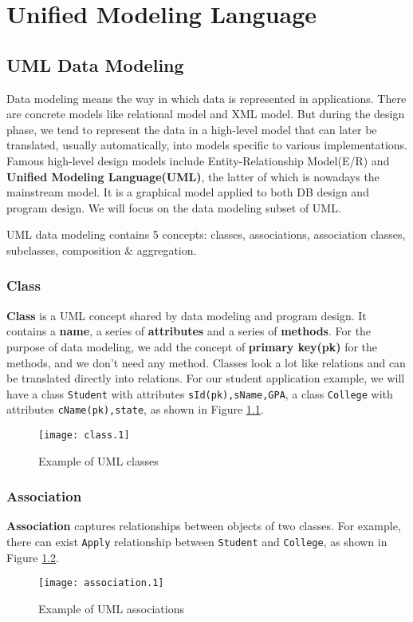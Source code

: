 \ifx\PREAMBLE\undefined


\fi
\chapter{Unified Modeling Language}
\section{UML Data Modeling}
Data modeling means the way in which data is represented in applications. There are concrete models like relational model and XML model. But during the design phase, we tend to represent the data in a high-level model that can later be translated, usually automatically, into models specific to various implementations. Famous high-level design models include Entity-Relationship Model(E/R) and \textbf{Unified Modeling Language(UML)}, the latter of which is nowadays the mainstream model. It is a graphical model applied to both DB design and program design. We will focus on the data modeling subset of UML.

UML data modeling contains 5 concepts: classes, associations, association classes, subclasses, composition \& aggregation. 
\subsection{Class}
\textbf{Class} is a UML concept shared by data modeling and program design. It contains a \textbf{name}, a series of \textbf{attributes} and a series of \textbf{methods}. For the purpose of data modeling, we add the concept of \textbf{primary key(pk)} for the methods, and we don't need any method. Classes look a lot like relations and can be translated directly into relations. For our student application example, we will have a class \texttt{Student} with attributes \texttt{sId(pk),sName,GPA}, a class \texttt{College} with attributes \texttt{cName(pk),state}, as shown in Figure \ref{class}.
\begin{figure}[ht]
\centering
\texttt{[image: class.1]}
\caption{Example of UML classes}\label{class}
\end{figure}
\subsection{Association}
\textbf{Association} captures relationships between objects of two classes. For example, there can exist \texttt{Apply} relationship between \texttt{Student} and \texttt{College}, as shown in Figure \ref{association}.
\begin{figure}[ht]
\centering
\texttt{[image: association.1]}
\caption{Example of UML associations}\label{association}
\end{figure}

